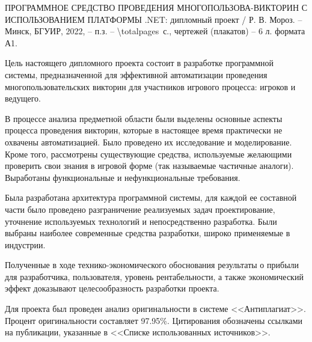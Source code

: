\thispagestyle{empty}


\noindent
ПРОГРАММНОЕ СРЕДСТВО ПРОВЕДЕНИЯ МНОГОПОЛЬЗОВА- ВИКТОРИН С ИСПОЛЬЗОВАНИЕМ ПЛАТФОРМЫ .NET: дипломный проект / Р. В. Мороз. -- Минск, БГУИР,
2022, -- п.з. -- \num{\totalpages}~с., чертежей (плакатов) -- 6 л. формата А1.
\newline

Цель настоящего дипломного проекта состоит в разработке программной системы, предназначенной для эффективной автоматизации проведения 
многопользовательских викторин для участников игрового процесса: игроков и ведущего. 

В процессе анализа предметной области были выделены основные аспекты процесса проведения викторин, которые в настоящее время практически не охвачены автоматизацией. 
Было проведено их исследование и моделирование. Кроме того, рассмотрены существующие средства, используемые желающими проверить свои знания в игровой форме (так называемые частичные аналоги). 
Выработаны функциональные и нефункциональные требования.

Была разработана архитектура программной системы, для каждой ее составной части было проведено разграничение реализуемых задач проектирование, 
уточнение используемых технологий и непосредственно разработка. Были выбраны наиболее современные средства разработки, широко применяемые в индустрии. 

Полученные в ходе технико-экономического обоснования результаты о прибыли для разработчика, пользователя, уровень рентабельности, а также экономический эффект доказывают целесообразность разработки проекта.

Для проекта был проведен анализ оригинальности в системе <<Антиплагиат>>. Процент оригинальности составляет 97.95\%. Цитирования обозначены ссылками на публикации, указанные в <<Списке использованных источников>>.
